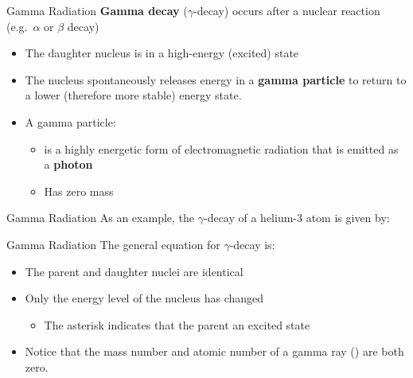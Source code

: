 \documentclass[12pt,compress,aspectratio=169]{beamer}
\begin{document}
\begin{frame}{Gamma Radiation}
  \textbf{Gamma decay} ($\gamma$-decay) occurs after a nuclear reaction
  (e.g.\ $\alpha$ or $\beta$ decay)
  \begin{itemize}
  \item The daughter nucleus is in a high-energy (excited) state
  \item The nucleus spontaneously releases energy in a \textbf{gamma particle}
    to return to a lower (therefore more stable) energy state.
  \item A gamma particle:
    \begin{itemize}
    \item is a highly energetic form of electromagnetic radiation that is
      emitted as a \textbf{photon}
    \item Has zero mass
    \end{itemize}
  \end{itemize}
\end{frame}


\begin{frame}{Gamma Radiation}
  As an example, the $\gamma$-decay of a helium-3 atom is given by:
  \begin{center}
  \end{center}

\end{frame}



\begin{frame}{Gamma Radiation}
  The general equation for $\gamma$-decay is:

  \begin{itemize}
  \item The parent and daughter nuclei are identical
  \item Only the energy level of the nucleus has changed
    \begin{itemize}
    \item The asterisk indicates that the parent an excited state
    \end{itemize}
  \item Notice that the mass number and atomic number of a gamma ray
    () are both zero.
  \end{itemize}
\end{frame}
\end{document}
